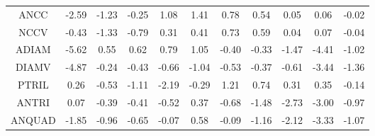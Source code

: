 \documentclass[11pt,a4paper]{report}
\begin{document}
\begin{centering}
\begin{adjustwidth}{-2in}{-1in}
\begin{longtable}{ | c || c | c | c | c | c | c | c | c | c || c |}
ANCC &  \cellcolor[HTML]{FFBFBF} -2.59 &  \cellcolor[HTML]{FFDFDF} -1.23 &  \cellcolor[HTML]{FFF7F7} -0.25 &  \cellcolor[HTML]{E7E7FF} 1.08 &  \cellcolor[HTML]{DFDFFF} 1.41 &  \cellcolor[HTML]{EFEFFF} 0.78 &  \cellcolor[HTML]{EFEFFF} 0.54 &  \cellcolor[HTML]{FFFFFF} 0.05 &  \cellcolor[HTML]{FFFFFF} 0.06 &  \cellcolor[HTML]{FFFFFF} -0.02 \\
NCCV &  \cellcolor[HTML]{FFF7F7} -0.43 &  \cellcolor[HTML]{FFDFDF} -1.33 &  \cellcolor[HTML]{FFEFEF} -0.79 &  \cellcolor[HTML]{F7F7FF} 0.31 &  \cellcolor[HTML]{F7F7FF} 0.41 &  \cellcolor[HTML]{EFEFFF} 0.73 &  \cellcolor[HTML]{EFEFFF} 0.59 &  \cellcolor[HTML]{FFFFFF} 0.04 &  \cellcolor[HTML]{FFFFFF} 0.07 &  \cellcolor[HTML]{FFFFFF} -0.04 \\
ADIAM &  \cellcolor[HTML]{FF7070} -5.62 &  \cellcolor[HTML]{EFEFFF} 0.55 &  \cellcolor[HTML]{EFEFFF} 0.62 &  \cellcolor[HTML]{EFEFFF} 0.79 &  \cellcolor[HTML]{E7E7FF} 1.05 &  \cellcolor[HTML]{FFF7F7} -0.40 &  \cellcolor[HTML]{FFF7F7} -0.33 &  \cellcolor[HTML]{FFD7D7} -1.47 &  \cellcolor[HTML]{FF8F8F} -4.41 &  \cellcolor[HTML]{FFE7E7} -1.02 \\
DIAMV &  \cellcolor[HTML]{FF8787} -4.87 &  \cellcolor[HTML]{FFF7F7} -0.24 &  \cellcolor[HTML]{FFF7F7} -0.43 &  \cellcolor[HTML]{FFEFEF} -0.66 &  \cellcolor[HTML]{FFE7E7} -1.04 &  \cellcolor[HTML]{FFEFEF} -0.53 &  \cellcolor[HTML]{FFF7F7} -0.37 &  \cellcolor[HTML]{FFEFEF} -0.61 &  \cellcolor[HTML]{FFA7A7} -3.44 &  \cellcolor[HTML]{FFDFDF} -1.36 \\
PTRIL &  \cellcolor[HTML]{F7F7FF} 0.26 &  \cellcolor[HTML]{FFEFEF} -0.53 &  \cellcolor[HTML]{FFE7E7} -1.11 &  \cellcolor[HTML]{FFC7C7} -2.19 &  \cellcolor[HTML]{FFF7F7} -0.29 &  \cellcolor[HTML]{DFDFFF} 1.21 &  \cellcolor[HTML]{EFEFFF} 0.74 &  \cellcolor[HTML]{F7F7FF} 0.31 &  \cellcolor[HTML]{F7F7FF} 0.35 &  \cellcolor[HTML]{FFFFFF} -0.14 \\
ANTRI &  \cellcolor[HTML]{FFFFFF} 0.07 &  \cellcolor[HTML]{FFF7F7} -0.39 &  \cellcolor[HTML]{FFF7F7} -0.41 &  \cellcolor[HTML]{FFEFEF} -0.52 &  \cellcolor[HTML]{F7F7FF} 0.37 &  \cellcolor[HTML]{FFEFEF} -0.68 &  \cellcolor[HTML]{FFD7D7} -1.48 &  \cellcolor[HTML]{FFB7B7} -2.73 &  \cellcolor[HTML]{FFB7B7} -3.00 &  \cellcolor[HTML]{FFE7E7} -0.97 \\
ANQUAD &  \cellcolor[HTML]{FFCFCF} -1.85 &  \cellcolor[HTML]{FFE7E7} -0.96 &  \cellcolor[HTML]{FFEFEF} -0.65 &  \cellcolor[HTML]{FFFFFF} -0.07 &  \cellcolor[HTML]{EFEFFF} 0.58 &  \cellcolor[HTML]{FFFFFF} -0.09 &  \cellcolor[HTML]{FFDFDF} -1.16 &  \cellcolor[HTML]{FFC7C7} -2.12 &  \cellcolor[HTML]{FFA7A7} -3.33 &  \cellcolor[HTML]{FFE7E7} -1.07 \\

\end{longtable}
\end{adjustwidth}
\end{centering}
\end{document}
